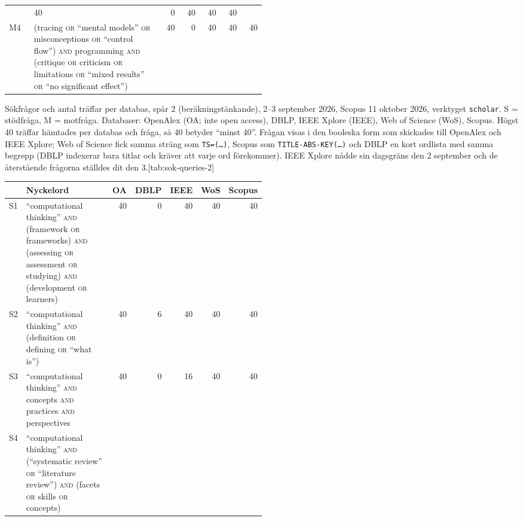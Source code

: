 \begin{table}[htbp]
\begin{sidecaption}
\begin{tabular}{@{}lp{0.5\linewidth}rrrrr@{}}
         & 40 & 0 & 40 & 40 & 40 \\
      M4 & (tracing \textsc{or} \enquote{mental models} \textsc{or} misconceptions \textsc{or} \enquote{control flow}) \textsc{and} programming \textsc{and} (critique \textsc{or} criticism \textsc{or} limitations \textsc{or} \enquote{mixed results} \textsc{or} \enquote{no significant effect})
         & 40 & 0 & 40 & 40 & 40 \\
      \bottomrule
    \end{tabular}
  \end{sidecaption}
\end{table}

\begin{table}[htbp]
  \begin{sidecaption}{Sökfrågor och antal träffar per databas, spår 2 (beräkningstänkande),
    2--3 september 2026, Scopus 11 oktober 2026, verktyget \texttt{scholar}.  S = stödfråga, M = motfråga.
    Databaser: OpenAlex (OA; inte \foreignlanguage{english}{open access}),
    DBLP, IEEE Xplore (IEEE), Web of Science (WoS), Scopus.  Högst 40
    träffar hämtades per databas och fråga, så 40 betyder \enquote{minst
    40}.  Frågan visas i den booleska form som skickades till OpenAlex
    och IEEE Xplore; Web of Science fick samma sträng som
    \texttt{TS=(\dots)}, Scopus som \texttt{TITLE-ABS-KEY(\dots)} och DBLP
    en kort ordlista med samma begrepp (DBLP indexerar bara titlar och
    kräver att varje ord förekommer).  IEEE Xplore nådde sin
    dagsgräns den 2 september och de återstående frågorna ställdes dit
    den 3.}[tab:sok-queries-2]
    \centering\footnotesize
    \begin{tabular}{@{}lp{0.5\linewidth}rrrrr@{}}
      \toprule
      & Nyckelord & OA & DBLP & IEEE & WoS & Scopus \\
      \midrule
      S1 & \enquote{computational thinking} \textsc{and} (framework \textsc{or} frameworks) \textsc{and} (assessing \textsc{or} assessment \textsc{or} studying) \textsc{and} (development \textsc{or} learners)
         & 40 & 0 & 40 & 40 & 40 \\
      S2 & \enquote{computational thinking} \textsc{and} (definition \textsc{or} defining \textsc{or} \enquote{what is})
         & 40 & 6 & 40 & 40 & 40 \\
      S3 & \enquote{computational thinking} \textsc{and} concepts \textsc{and} practices \textsc{and} perspectives
         & 40 & 0 & 16 & 40 & 40 \\
      S4 & \enquote{computational thinking} \textsc{and} (\enquote{systematic review} \textsc{or} \enquote{literature review}) \textsc{and} (facets \textsc{or} skills \textsc{or} concepts)

\end{tabular}
\end{sidecaption}
\end{table}

